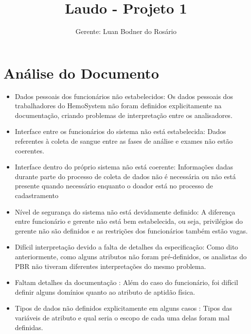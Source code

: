 \documentclass[12pt,a4paper,final]{report}
\author{Gerente: Luan Bodner do Rosário}
\title{Laudo - Projeto 1}
\begin{document}
\maketitle
\section*{Análise do Documento}
\begin{itemize}
\item Dados pessoais dos funcionários não estabelecidos: Os dados pessoais dos trabalhadores do HemoSystem não foram definidos explicitamente na documentação, criando problemas de interpretação entre os analisadores.

\item Interface entre os funcionários do sistema não está estabelecida: Dados referentes à coleta de sangue entre as fases de análise e exames não estão coerentes.

\item Interface dentro do próprio sistema não está coerente: Informações dadas durante parte do processo de coleta de dados não é necessária ou não está presente quando necessário enquanto o doador está no processo de cadastramento

\item Nível de segurança do sistema não está devidamente definido: A diferença entre funcionário e gerente não está bem estabelecida, ou seja, privilégios do gerente não são definidos e as restrições dos funcionários também estão vagas.

\item Difícil interpretação devido a falta de detalhes da especificação: Como dito anteriormente, como alguns atributos não foram pré-definidos, os analistas do PBR não tiveram diferentes interpretações do mesmo problema.

\item Faltam detalhes da documentação : Além do caso do funcionário, foi difícil definir alguns domínios quanto ao atributo de aptidão física.

\item Tipos de dados não definidos explicitamente em alguns casos : Tipos das variáveis de atributo e qual seria o escopo de cada uma delas foram mal definidas.

\end{itemize}
\end{document}
